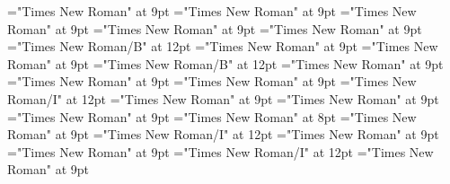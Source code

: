 \documentclass[gps1,twoside]{article}
\begin{document}
\font\spanowningentrysummarydefinitionvisiblecomplexformbackrefvisiblecomplexformbackrefssensesensessubentrysubentriesentryfirstchildbefore="Times New Roman" at 9pt
\font\spanowningentrysummarydefinitionvisiblecomplexformbackrefvisiblecomplexformbackrefssensesensessubentrysubentriesentrylastchildafter="Times New Roman" at 9pt
\font\nontrivialentryrootnontrivialentryrootnontrivialentryrootsvisiblecomplexformbackrefvisiblecomplexformbackrefssensesensessubentrysubentriesentrybefore="Times New Roman" at 9pt
\font\nontrivialentryrootsvisiblecomplexformbackrefvisiblecomplexformbackrefssensesensessubentrysubentriesentrybefore="Times New Roman" at 9pt
\font\nontrivialentryrootsvisiblecomplexformbackrefvisiblecomplexformbackrefssensesensessubentrysubentriesentryafter="Times New Roman" at 9pt
\font\nontrivialentryrootnontrivialentryrootsvisiblecomplexformbackrefvisiblecomplexformbackrefssensesensessubentrysubentriesentry="Times New Roman/B" at 12pt
\font\spanspansensecontentspansensessensesensessubentrysubentriesentrybefore="Times New Roman" at 9pt
\font\sensessensesensessubentrysubentriesentryafter="Times New Roman" at 9pt
\font\sensenumbersensecontentsensessensesensessubentrysubentriesentry="Times New Roman/B" at 12pt
\font\sensenumbersensecontentsensessensesensessubentrysubentriesentryafter="Times New Roman" at 9pt
\font\sensetypesensesensessensesensessubentrysubentriesentrybefore="Times New Roman" at 9pt
\font\sensetypesensesensessensesensessubentrysubentriesentryafter="Times New Roman" at 9pt
\font\sensetypesensesensessensesensessubentrysubentriesentry="Times New Roman/I" at 12pt
\font\spanspanabbreviationsensetypesensesensessensesensessubentrysubentriesentrybefore="Times New Roman" at 9pt
\font\spanspandefinitionorglosssensesensessensesensessubentrysubentriesentrybefore="Times New Roman" at 9pt
\font\spandefinitionorglosssensesensessensesensessubentrysubentriesentrylastchildafter="Times New Roman" at 9pt
\font\exampleexampleexamplessensesensessensesensessubentrysubentriesentrybefore="Times New Roman" at 8pt
\font\examplessensesensessensesensessubentrysubentriesentryafter="Times New Roman" at 9pt
\font\spanbzhexampleexampleexamplessensesensessensesensessubentrysubentriesentry="Times New Roman/I" at 12pt
\font\spanspanexampleexampleexamplessensesensessensesensessubentrysubentriesentrybefore="Times New Roman" at 9pt
\font\spanexampleexampleexamplessensesensessensesensessubentrysubentriesentrylastchildafter="Times New Roman" at 9pt
\font\spanexampleexampleexamplessensesensessensesensessubentrysubentriesentry="Times New Roman/I" at 12pt
\font\spanspantranslationtranslationtranslationsexampleexamplessensesensessensesensessubentrysubentriesentrybefore="Times New Roman" at 9pt
\end{document}
